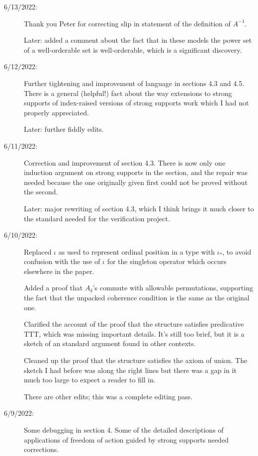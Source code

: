 \documentclass[112pt]{article}
\begin{document}
\begin{description}

\item[6/13/2022:]  Thank you Peter for correcting slip in statement of the definition of $A^{-1}$.

Later:  added a comment about the fact that in these models the power set of a well-orderable set is well-orderable, which is a significant discovery.

\item[6/12/2022:]  Further tightening and improvement of language in sections 4.3 and 4.5.  There is a general (helpful!) fact about the way extensions to strong supports of index-raised versions of strong supports work which I had not properly appreciated.

Later: further fiddly edits.

\item[6/11/2022:]  Correction and improvement of section 4.3.  There is now only one induction argument on strong supports in the section, and the repair was needed because the one originally given first could not be proved without the second.

Later:  major rewriting of section 4.3, which I think brings it much closer to the standard needed for the verification project.

\item[6/10/2022:]  Replaced $\iota$ as used to represent ordinal position in a type with $\iota_*$, to avoid confusion with the use of $\iota$ for the singleton operator which occurs elsewhere in the paper.

Added a proof that $A_\delta$'s commute with allowable permutations, supporting the fact that the unpacked coherence condition is the same as the original one.

Clarified the account of the proof that the structure satisfies predicative TTT, which was missing important details.   It's still too brief, but it is a sketch of an standard argument found in other contexts.

Cleaned up the proof that the structure satisfies the axiom of union.  The sketch I had before was along the right lines but there was a gap in it much too large to expect a reader to fill in.

There are other edits;  this was a complete editing pass.

\item[6/9/2022:]  Some debugging in section 4.  Some of the detailed descriptions of applications of freedom of action guided by strong supports needed corrections.  


\end{description}
\end{document}
